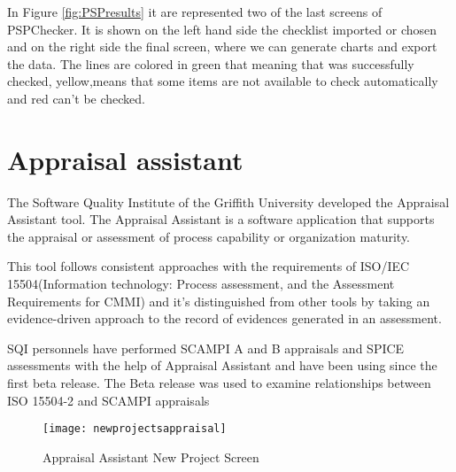 In Figure \ref{fig:PSPresults} it are represented two of the last screens of PSPChecker. It is shown on the left hand side the checklist imported or chosen and on the right side the final screen, where we can generate charts and export the data. The lines are colored in green that meaning that was successfully checked, yellow,means that some items are not available to check automatically and red can't be checked. 

\section{Appraisal assistant}

The Software Quality Institute of the Griffith University\citep{SoftwareQuality2015} developed the Appraisal Assistant tool. The Appraisal Assistant\citep{Appraisal2015} is a software application that supports the appraisal or assessment of process capability or organization maturity.

This tool follows consistent approaches with the requirements of ISO/IEC 15504(Information technology: Process assessment, and the Assessment Requirements for CMMI)\citep{ISOIEC} and it's distinguished from other tools by taking an evidence-driven approach to the record of evidences generated in an assessment.

SQI personnels have performed SCAMPI A and B appraisals and SPICE assessments with the help of Appraisal Assistant and have been using since the first beta release. The Beta release was used to examine relationships between ISO 15504-2 and SCAMPI appraisals

\begin{figure}[h]
	\begin{center}
		\leavevmode
		\texttt{[image: newprojectsappraisal]}
		\caption{Appraisal Assistant New Project Screen}
		\label{fig:newprojectsappraisal}
	\end{center}
\end{figure}

